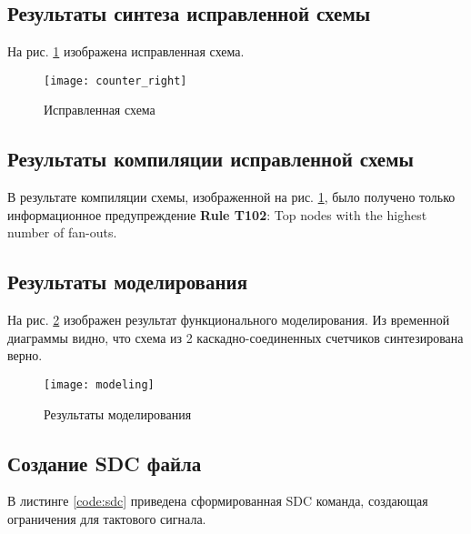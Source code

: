 \subsection{Результаты синтеза исправленной схемы}

На рис. \ref{fig:counter_right} изображена исправленная схема.

\begin{figure}[H]
\begin{center}
	\texttt{[image: counter\_right]}
	\caption{Исправленная схема}
	\label{fig:counter_right}
\end{center}
\end{figure}

\subsection{Результаты компиляции исправленной схемы}

В результате компиляции схемы, изображенной на рис. \ref{fig:counter_right}, было получено только информационное предупреждение \textbf{Rule T102}: Top nodes with the highest number of fan-outs. 

\subsection{Результаты моделирования}

На рис. \ref{fig:modeling} изображен результат функционального моделирования. Из временной диаграммы видно, что схема из 2 каскадно-соединенных счетчиков синтезирована верно.

\begin{figure}[H]
\begin{center}
	\texttt{[image: modeling]}
	\caption{Результаты моделирования}
	\label{fig:modeling}
\end{center}
\end{figure}


\subsection{Создание SDC файла}

В листинге \ref{code:sdc} приведена сформированная SDC команда, создающая ограничения для тактового сигнала.

